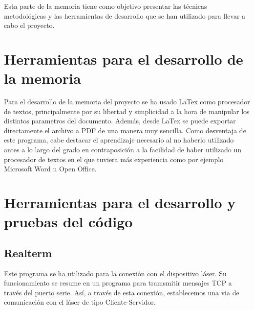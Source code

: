 
Esta parte de la memoria tiene como objetivo presentar las técnicas metodológicas y las herramientas de desarrollo que se han utilizado para llevar a cabo el proyecto. 


\section{Herramientas para el desarrollo de la memoria}
Para el desarrollo de la memoria del proyecto se ha usado LaTex como procesador de textos, principalmente por su libertad y simplicidad a la hora de manipular los distintos parametros del documento. Además, desde LaTex se puede exportar directamente el archivo a PDF de una manera muy sencilla.
Como desventaja de este programa, cabe destacar el aprendizaje necesario al no haberlo utilizado antes a lo largo del grado en contraposición a la facilidad de haber utilizado un procesador de textos en el que tuviera más experiencia como por ejemplo Microsoft Word u Open Office.

\section{Herramientas para el desarrollo y pruebas del código}

\subsection{Realterm}
Este programa se ha utilizado para la conexión con el dispositivo láser. Su funcionamiento se resume en un programa para tramsmitir mensajes TCP a través del puerto serie. Así, a través de esta conexión, establecemos una via de comunicación con el láser de tipo Cliente-Servidor.

